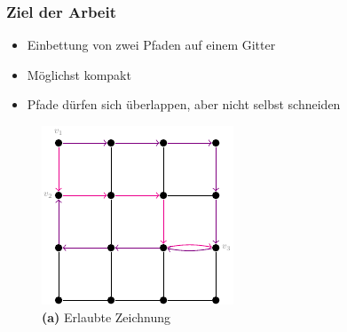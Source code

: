 \documentclass[9pt]{beamer}
\begin{document}
    \begin{frame}
    \frametitle{Ziel der Arbeit}
    \begin{itemize}
        \item Einbettung von zwei Pfaden auf einem Gitter
        \item Möglichst kompakt
        \item Pfade dürfen sich überlappen, aber nicht selbst schneiden
    \end{itemize} \pause

    \begin{figure}
        \centering
        \begin{minipage}{0.48\textwidth}
            \centering
            \includegraphics[width=\linewidth]{figures/Erlaubt.pdf}
            \caption*{\textbf{(a)} Erlaubte Zeichnung}
        \end{minipage}\hfill
        \begin{minipage}{0.48\textwidth}
            \centering

\end{minipage}
\end{figure}
\end{frame}
\end{document}
